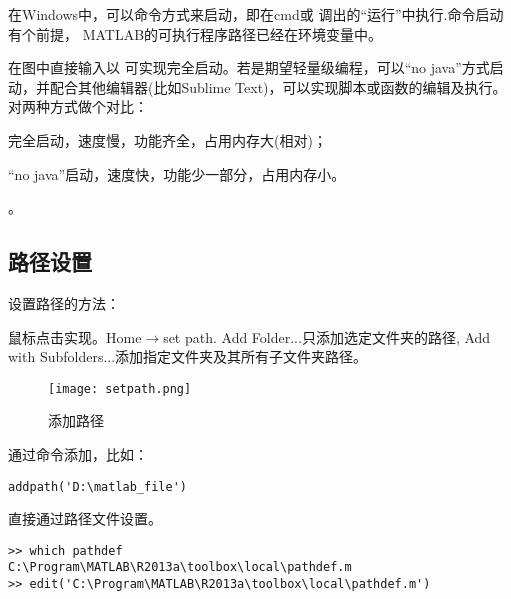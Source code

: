 在Windows中，可以命令方式来启动，即在cmd或  调出的“运行”中执行.命令启动有个前提， MATLAB的可执行程序路径已经在环境变量中。\par

在图中直接输入以  可实现完全启动。若是期望轻量级编程，可以“no java”方式启动，并配合其他编辑器(比如Sublime Text)，可以实现脚本或函数的编辑及执行。对两种方式做个对比：

\begindot
  \item 完全启动，速度慢，功能齐全，占用内存大(相对)；
  \item “no java”启动，速度快，功能少一部分，占用内存小。
\myenddot

。





\subsection{路径设置}

设置路径的方法：

\begindot
\item 鼠标点击实现。Home$\rightarrow$set path. Add Folder...只添加选定文件夹的路径, Add with Subfolders...添加指定文件夹及其所有子文件夹路径。

  \begin{figure}[htbp]
    \texttt{[image: setpath.png]}
    \caption{添加路径}
  \end{figure}

\item 通过命令添加，比如：

\vspace{-0.4cm}
\begin{lstlisting}
addpath('D:\matlab_file')
\end{lstlisting}

\item 直接通过路径文件设置。

\vspace{-0.4cm}
\begin{lstlisting}
>> which pathdef
C:\Program\MATLAB\R2013a\toolbox\local\pathdef.m
>> edit('C:\Program\MATLAB\R2013a\toolbox\local\pathdef.m')
\end{lstlisting}

